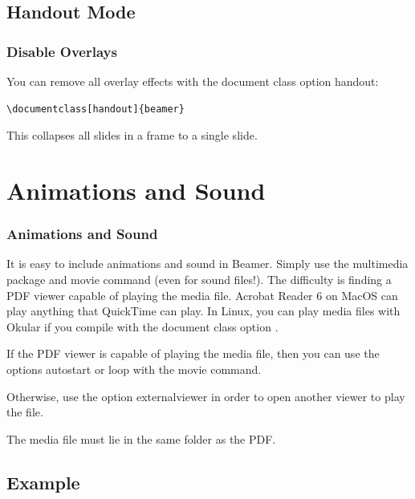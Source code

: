 \documentclass[UKenglish, unknownkeysallowed]{beamer}
\begin{document}
\subsection{Handout Mode}


\begin{frame}[fragile]
    \frametitle{Disable Overlays}

    You can remove all overlay effects with the document class option \alert{handout}:
\begin{lstlisting}[language = {[LaTeX]{TeX}}]
\documentclass[handout]{beamer}
\end{lstlisting}
    This collapses all slides in a frame to a single slide.
\end{frame}


\section{Animations and Sound}


\begin{frame}
    \frametitle{Animations and Sound}

    It is easy to include animations and sound in Beamer.
    Simply use the \alert{multimedia} package
    and \alert{movie} command (even for sound files!).
    The difficulty is finding a PDF viewer capable of playing the media file.
    Acrobat Reader 6 on MacOS can play anything that QuickTime can play.
    In Linux, you can play media files with Okular
    if you compile with the document class option .

    \medskip

    If the PDF viewer is capable of playing the media file,
    then you can use the options \alert{autostart} or \alert{loop}
    with the \alert{movie} command.

    \medskip

    Otherwise, use the option \alert{externalviewer}
    in order to open another viewer to play the file.

    \medskip

    The media file must lie in the same folder as the PDF.
\end{frame}


\subsection{Example}
\end{document}
